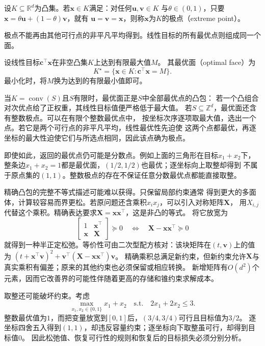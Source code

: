 \begin{definition}[凸集的极点]
\label{def:opt-extreme-point}
设$K\subseteq\mathbb R^d$为凸集。若$\bm x\in K$满足：对任何$\bm u,\bm v\in K$
与$\theta\in(0,1)$，只要$\bm x=\theta\bm u+(1-\theta)\bm v$，就有
$\bm u=\bm v=\bm x$，则称$\bm x$为$K$的极点（extreme point）。
\end{definition}
极点不能再由其他可行点的非平凡平均得到。线性目标的所有最优点则组成同一个面。
\begin{definition}[线性目标的最优面]
\label{def:opt-optimal-face}
设线性目标$\bm c^\top\bm x$在非空凸集$K$上达到有限最大值$M$。
其最优面（optimal face）为
\[
  K^\star=\{\bm x\in K:\bm c^\top\bm x=M\}.
\]
最小化时，将$M$换为达到的有限最小值即可。
\end{definition}
当$K=\operatorname{conv}(S)$且$S$有限时，最优面正是$S$中全部最优点的凸包：
若一个凸组合对次优点给了正权重，其线性目标值便严格低于最大值。
若$S\subseteq\mathbb Z^d$，最优面还含有整数极点。可以在有限个整数最优点中，
按坐标次序逐项取最大值，选出一个点。若它是两个可行点的非平凡平均，线性最优性先迫使
这两个点都最优，再逐坐标的最大性迫使它们与所选点相同，因此该点确为极点。

即使如此，返回的最优点仍可能是分数点。例如上面的三角形在目标$x_1+x_2$下，
整条边$x_1+x_2=1$都是最优面，$(1/2,1/2)$也最优；逐坐标向上取整却得到
不属于原点集的$(1,1)$。整数极点的存在不保证任意分数最优点都能直接取整。

精确凸包的完整不等式描述可能难以获得。只保留局部约束通常
得到更大的多面体，计算较容易而界更松。若原问题还含乘积$x_ix_j$，可以引入对称矩阵$\bm X$，
用$X_{i,j}$代替这个乘积。精确表达要求$\bm X=\bm x\bm x^\top$，这是非凸的等式。
将它放宽为
\[
 \begin{bmatrix}1&\bm x^\top\\\bm x&\bm X\end{bmatrix}\succeq0
 \quad\Longleftrightarrow\quad \bm X-\bm x\bm x^\top\succeq0
\]
就得到一种半正定松弛。等价性可由二次型配方核对：该块矩阵在$(t,\bm v)$上的值为
$(t+\bm x^\top\bm v)^2+\bm v^\top(\bm X-\bm x\bm x^\top)\bm v$。
精确乘积总满足新约束，但新约束允许$\bm X$与真实乘积有偏差；原来的其他约束也必须保留或相应转换。
新增矩阵有$O(d^2)$个元素，因而它改善界的可能性伴随着更高的存储和锥约束求解成本。

取整还可能破坏约束。考虑
\[
  \max_{x_1,x_2\in\{0,1\}}x_1+x_2
  \quad\text{s.t.}\quad 2x_1+2x_2\leq3.
\]
整数最优值为$1$，而把变量放宽到$[0,1]$后，$(3/4,3/4)$可行且目标值为$3/2$。
逐坐标四舍五入得到$(1,1)$，却违反容量约束；逐坐标向下取整虽可行，却得到目标值$0$。
因此松弛值、恢复可行性的规则和恢复后的目标损失必须分别分析。

